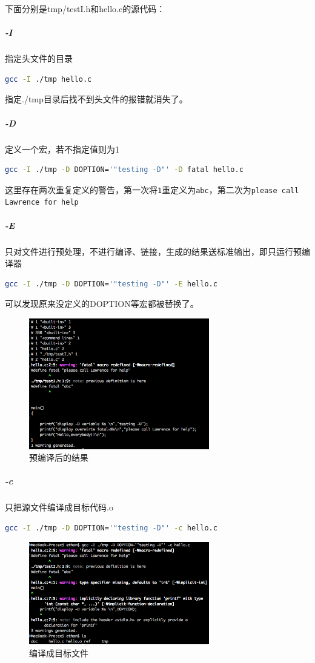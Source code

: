 \documentclass{JNUexp}
\begin{document}
\begin{answer}
    下面分别是tmp/testI.h和hello.c的源代码：

        
        

    \subparagraph{-I} 指定头文件的目录
    \begin{lstlisting}[language=sh]
gcc -I ./tmp hello.c
    \end{lstlisting}
    指定./tmp目录后找不到头文件的报错就消失了。

    \subparagraph{-D} 定义一个宏，若不指定值则为1 
    \begin{lstlisting}[language=sh]
gcc -I ./tmp -D DOPTION='"testing -D"' -D fatal hello.c
    \end{lstlisting}
    这里存在两次重复定义的警告，第一次将\lstinline{1}重定义为\lstinline{abc}，第二次为\lstinline{please call Lawrence for help}


    \subparagraph{-E} 只对文件进行预处理，不进行编译、链接，生成的结果送标准输出，即只运行预编译器 \\
    \begin{lstlisting}[language=sh]
gcc -I ./tmp -D DOPTION='"testing -D"' -E hello.c
    \end{lstlisting}
    可以发现原来没定义的DOPTION等宏都被替换了。
    \begin{figure}[h]
        \centering
        \includegraphics[width=0.7\textwidth]{1}
        \caption{预编译后的结果}
    \end{figure}

    \subparagraph{-c} 只把源文件编译成目标代码.o
    \begin{lstlisting}[language=sh]
gcc -I ./tmp -D DOPTION='"testing -D"' -c hello.c
    \end{lstlisting}
    \begin{figure}[h]
        \centering
        \includegraphics[width=0.7\textwidth]{2}
        \caption{编译成目标文件}
    \end{figure}


\end{answer}
\end{document}
